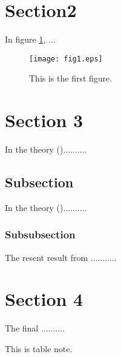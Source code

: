 \documentclass[]{pasj01}
\begin{document}
\section{Section2}

In figure \ref{fig:sample}, ...

\begin{figure}
 \begin{center}
  \texttt{[image: fig1.eps]} 
 \end{center}
\caption{This is the first figure.}\label{fig:sample}
\end{figure}


\section{Section 3}

In the theory (\cite{key-1})..........

\subsection{Subsection}

In the theory (\cite{key-2})..........

\subsubsection{Subsubsection}

The resent result from ...........


\newpage

\section{Section 4}

The final ..........



\begin{table}
  \label{tab:first}
\begin{tabnote}
This is table note.
\end{tabnote}
\end{table}
\end{document}
